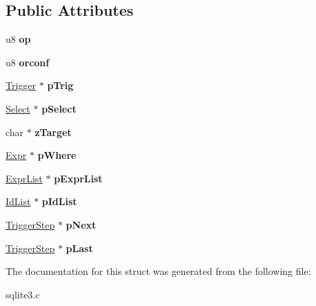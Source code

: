 \subsection*{Public Attributes}
\begin{DoxyCompactItemize}
\item 
u8 {\bfseries op}\hypertarget{structTriggerStep_a20269855c80d869d498fcb93401832fd}{}\label{structTriggerStep_a20269855c80d869d498fcb93401832fd}

\item 
u8 {\bfseries orconf}\hypertarget{structTriggerStep_a4ed8b2571fde96e84f637184453e73e3}{}\label{structTriggerStep_a4ed8b2571fde96e84f637184453e73e3}

\item 
\hyperlink{structTrigger}{Trigger} $\ast$ {\bfseries p\+Trig}\hypertarget{structTriggerStep_a70671e85796776db06c732ab6ae4ae0d}{}\label{structTriggerStep_a70671e85796776db06c732ab6ae4ae0d}

\item 
\hyperlink{structSelect}{Select} $\ast$ {\bfseries p\+Select}\hypertarget{structTriggerStep_a90bf3353653cedf364a7fb2eb89a19c4}{}\label{structTriggerStep_a90bf3353653cedf364a7fb2eb89a19c4}

\item 
char $\ast$ {\bfseries z\+Target}\hypertarget{structTriggerStep_a5e48fd22b4e42ca72ae6e505861483df}{}\label{structTriggerStep_a5e48fd22b4e42ca72ae6e505861483df}

\item 
\hyperlink{structExpr}{Expr} $\ast$ {\bfseries p\+Where}\hypertarget{structTriggerStep_ad4c293b04dfda535f3aad5b9e02726c7}{}\label{structTriggerStep_ad4c293b04dfda535f3aad5b9e02726c7}

\item 
\hyperlink{structExprList}{Expr\+List} $\ast$ {\bfseries p\+Expr\+List}\hypertarget{structTriggerStep_a607602af65ecf6c7e6cac4ea8532ac1d}{}\label{structTriggerStep_a607602af65ecf6c7e6cac4ea8532ac1d}

\item 
\hyperlink{structIdList}{Id\+List} $\ast$ {\bfseries p\+Id\+List}\hypertarget{structTriggerStep_a6b91bf578544104f8bd4bd5b958ddd8c}{}\label{structTriggerStep_a6b91bf578544104f8bd4bd5b958ddd8c}

\item 
\hyperlink{structTriggerStep}{Trigger\+Step} $\ast$ {\bfseries p\+Next}\hypertarget{structTriggerStep_a0757a0d22dbe2f7f57706014dd35759b}{}\label{structTriggerStep_a0757a0d22dbe2f7f57706014dd35759b}

\item 
\hyperlink{structTriggerStep}{Trigger\+Step} $\ast$ {\bfseries p\+Last}\hypertarget{structTriggerStep_a0aae9ea7f436881c0e9e614476a69584}{}\label{structTriggerStep_a0aae9ea7f436881c0e9e614476a69584}

\end{DoxyCompactItemize}


The documentation for this struct was generated from the following file\+:\begin{DoxyCompactItemize}
\item 
sqlite3.\+c\end{DoxyCompactItemize}
